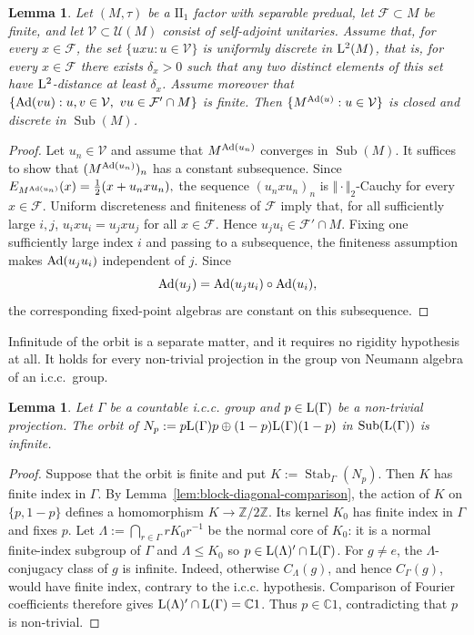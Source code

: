 \documentclass[12pt]{amsart} %
\theoremstyle{plain}
\newtheorem{lemma}[theorem]{Lemma}
\theoremstyle{definition}
\newcommand{\C}{\mathbb{C}}
\newcommand{\Z}{\mathbb{Z}}
\newcommand{\LL}{{\rm L}}
\newcommand{\Ad}{{\rm Ad}}
\newcommand{\Ucal}{\mathcal{U}}
\DeclareMathOperator{\Sub}{Sub}
\begin{document}
\begin{lemma}\label{lem:uniformly-discrete-symmetries}
Let $(M,\tau)$ be a $\mathrm{II}_1$ factor with separable predual, let
$\mathcal F\subset M$ be finite, and let
$\mathcal V\subset\Ucal(M)$ consist of self-adjoint unitaries.
Assume that, for every $x\in\mathcal F$, the set
$\{uxu:u\in\mathcal V\}$
is uniformly discrete in $\LL^2(M)$, that is, for every $x\in\mathcal F$ there
exists $\delta_x>0$ such that any two distinct elements of this set have
$\LL^2$-distance at least $\delta_x$.
Assume moreover that
$\{\Ad(vu):u,v\in\mathcal V,\ vu\in\mathcal F'\cap M\}$
is finite. Then
$\{M^{\Ad(u)}:u\in\mathcal V\}$
is closed and discrete in $\Sub(M)$.
\end{lemma}
\begin{proof}
Let $u_n\in\mathcal V$ and assume that $M^{\Ad(u_n)}$ converges in
$\Sub(M)$. It suffices to show that $(M^{\Ad(u_n)})_n$ has a constant subsequence. Since
$E_{M^{\Ad(u_n)}}(x)=\frac12(x+u_nxu_n),$
the sequence $(u_nxu_n)_n$ is $\Vert\cdot\Vert_2$-Cauchy for every
$x\in\mathcal F$. Uniform discreteness and finiteness of $\mathcal F$ imply
that, for all sufficiently large $i,j$, $u_ixu_i=u_jxu_j$ for all $x\in\mathcal F$.
Hence $u_ju_i\in\mathcal F'\cap M$. Fixing one sufficiently large index
$i$ and passing to a subsequence, the finiteness assumption makes
$\Ad(u_ju_i)$ independent of $j$. Since
$$
\Ad(u_j)=\Ad(u_ju_i)\circ\Ad(u_i),
$$
the corresponding fixed-point algebras are constant on this subsequence.\end{proof}

\noindent Infinitude of the orbit is a separate matter, and it requires no
rigidity hypothesis at all. It holds for every non-trivial projection in the
group von Neumann algebra of an i.c.c.\ group.
\medskip

\begin{lemma}\label{lem:corner-orbit-infinite}
Let $\Gamma$ be a countable i.c.c. group and $p\in \LL(\Gamma)$ be a non-trivial projection. The orbit of
$N_p:=p\LL(\Gamma)p\oplus(1-p)\LL(\Gamma)(1-p)$ in $\Sub(\LL(\Gamma))$ is infinite.
\end{lemma}
\begin{proof}
Suppose that the orbit is finite and put
$K:=\operatorname{Stab}_\Gamma(N_p)$.
Then $K$ has finite index in $\Gamma$. By
Lemma~\ref{lem:block-diagonal-comparison}, the action of $K$ on
$\{p,1-p\}$ defines a homomorphism $K\to\Z/2\Z$. Its kernel
$K_0$ has finite index in $\Gamma$ and fixes $p$. Let 
$\Lambda:=\bigcap_{r\in\Gamma}rK_0r^{-1}$ be the normal core of $K_0$: it is a normal finite-index subgroup of $\Gamma$ and $\Lambda\leq K_0$ so
$p\in\LL(\Lambda)'\cap\LL(\Gamma)$. For $g\neq e$, the $\Lambda$-conjugacy
class of $g$ is infinite. Indeed, otherwise $C_\Lambda(g)$, and hence
$C_\Gamma(g)$, would have finite index, contrary to the i.c.c. hypothesis.
Comparison of Fourier coefficients therefore gives $\LL(\Lambda)'\cap\LL(\Gamma)=\C1$. Thus $p\in\C1$, contradicting that $p$ is non-trivial.
\end{proof}
\end{document}
